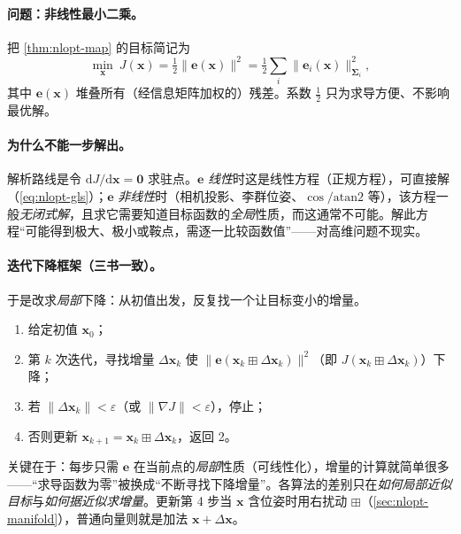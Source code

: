 \paragraph{问题：非线性最小二乘。}
把 \cref{thm:nlopt-map} 的目标简记为
\begin{equation}
  \min_{\mathbf{x}}\ J(\mathbf{x})=\tfrac12\big\|\mathbf{e}(\mathbf{x})\big\|^2=\tfrac12\sum_i\|\mathbf{e}_i(\mathbf{x})\|_{\boldsymbol{\Sigma}_i}^2,
  \label{eq:nls}
\end{equation}
其中 $\mathbf{e}(\mathbf{x})$ 堆叠所有（经信息矩阵加权的）残差。系数 $\tfrac12$ 只为求导方便、不影响最优解。

\paragraph{为什么不能一步解出。}
解析路线是令 $\mathrm{d}J/\mathrm{d}\mathbf{x}=\mathbf{0}$ 求驻点\cite{gaoxiang2019slam14}。$\mathbf{e}$ \emph{线性}时这是线性方程（正规方程），可直接解（\cref{eq:nlopt-gls}）；$\mathbf{e}$ \emph{非线性}时（相机投影、李群位姿、$\cos/\mathrm{atan2}$ 等），该方程一般\emph{无闭式解}，且求它需要知道目标函数的\emph{全局}性质，而这通常不可能。解此方程“可能得到极大、极小或鞍点，需逐一比较函数值”——对高维问题不现实。

\paragraph{迭代下降框架（三书一致）。}\cite{gaoxiang2019slam14,carlone2026handbook,barfoot2024state}
于是改求\emph{局部}下降：从初值出发，反复找一个让目标变小的增量。
\begin{enumerate}
  \item 给定初值 $\mathbf{x}_0$；
  \item 第 $k$ 次迭代，寻找增量 $\Delta\mathbf{x}_k$ 使 $\|\mathbf{e}(\mathbf{x}_k\boxplus\Delta\mathbf{x}_k)\|^2$（即 $J(\mathbf{x}_k\boxplus\Delta\mathbf{x}_k)$）下降；
  \item 若 $\|\Delta\mathbf{x}_k\|<\varepsilon$（或 $\|\nabla J\|<\varepsilon$），停止；
  \item 否则更新 $\mathbf{x}_{k+1}=\mathbf{x}_k\boxplus\Delta\mathbf{x}_k$，返回 2。
\end{enumerate}
关键在于：每步只需 $\mathbf{e}$ 在当前点的\emph{局部}性质（可线性化），增量的计算就简单很多——“求导函数为零”被换成“不断寻找下降增量”。各算法的差别只在\emph{如何局部近似目标}与\emph{如何据近似求增量}\cite{carlone2026handbook}。更新第 4 步当 $\mathbf{x}$ 含位姿时用右扰动 $\boxplus$（\cref{sec:nlopt-manifold}），普通向量则就是加法 $\mathbf{x}+\Delta\mathbf{x}$。

